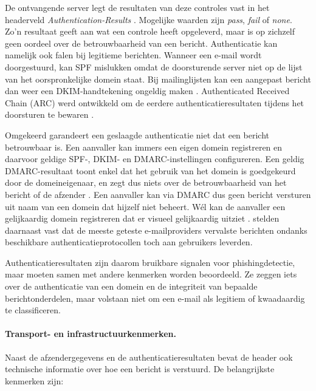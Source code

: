 De ontvangende server legt de resultaten van deze controles vast in het headerveld \emph{Authen\-tication-Results} \autocite{Kucherawy2019}. Mogelijke waarden zijn \emph{pass}, \emph{fail} of \emph{none}. Zo'n resultaat geeft aan wat een controle heeft opgeleverd, maar is op zichzelf geen oordeel over de betrouwbaarheid van een bericht.
Authenticatie kan namelijk ook falen bij legitieme berichten. Wanneer een e-mail wordt doorgestuurd, kan SPF mislukken omdat de doorsturende server niet op de lijst van het oorspronkelijke domein staat. Bij mailinglijsten kan een aangepast bericht dan weer een DKIM-handtekening ongeldig maken \autocite{Herr2026}. Authenticated Received Chain (ARC) werd ontwikkeld om de eerdere authenticatieresultaten tijdens het doorsturen te bewaren \autocite{Andersen2019}.

Omgekeerd garandeert een geslaagde authenticatie niet dat een bericht betrouwbaar is. Een aanvaller kan immers een eigen domein registreren en daarvoor geldige SPF-, DKIM- en DMARC-in\-stellingen configureren. Een geldig DMARC-resul\-taat toont enkel dat het gebruik van het domein is goedgekeurd door de domeineigenaar, en zegt dus niets over de betrouwbaarheid van het bericht of de afzender \autocite{Herr2026}. 
Een aanvaller kan via DMARC dus geen bericht versturen uit naam van een domein dat hijzelf niet beheert. Wél kan de aanvaller een gelijkaardig domein registreren dat er visueel gelijkaardig uitziet \autocite{Herr2026}. \textcite{Hu2018} stelden daarnaast vast dat de meeste geteste e-mailproviders vervalste berichten ondanks beschikbare authenticatieprotocollen toch aan gebruikers leverden.

Authenticatieresultaten zijn daarom bruikbare signalen voor phishingdetectie, maar moeten samen met andere kenmerken worden beoordeeld. Ze zeggen iets over de authenticatie van een domein en de integriteit van bepaalde berichtonderdelen, maar volstaan niet om een e-mail als legitiem of kwaadaardig te classificeren.


\paragraph{Transport- en infrastructuurkenmerken.}
\label{subsubsec:Afzender en e-mailheaders:transport}
Naast de afzendergegevens en de authenticatieresultaten bevat de header ook technische informatie over hoe een bericht is verstuurd. De belangrijkste kenmerken zijn:

